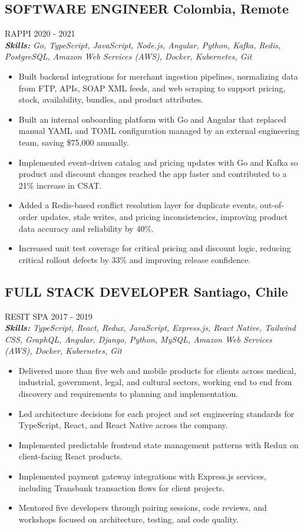 \documentclass{article}
\newcommand{\WorkExperience}[2]{
   \subsection*{#1}
   \vspace{-1em}
   \uppercase{#2}
}
\newcommand{\Skills}[1]{
   \textit{\textbf{Skills:} #1}
}
\begin{document}
\WorkExperience{SOFTWARE ENGINEER \hfill Colombia, Remote}{Rappi \hfill 2020 {-} 2021} \\
\Skills{Go, TypeScript, JavaScript, Node.js, Angular, Python, Kafka, Redis, PostgreSQL, Amazon Web Services (AWS), Docker, Kubernetes, Git}
\begin{itemize}
\item Built backend integrations for merchant ingestion pipelines, normalizing data from FTP, APIs, SOAP XML feeds, and web scraping to support pricing, stock, availability, bundles, and product attributes.
\item Built an internal onboarding platform with Go and Angular that replaced manual YAML and TOML configuration managed by an external engineering team, saving \$75,000 annually.
\item Implemented event-driven catalog and pricing updates with Go and Kafka so product and discount changes reached the app faster and contributed to a 21\% increase in CSAT.
\item Added a Redis-based conflict resolution layer for duplicate events, out-of-order updates, stale writes, and pricing inconsistencies, improving product data accuracy and reliability by 40\%.
\item Increased unit test coverage for critical pricing and discount logic, reducing critical rollout defects by 33\% and improving release confidence.
\end{itemize}

\WorkExperience{FULL STACK DEVELOPER \hfill Santiago, Chile}{Resit SPA \hfill 2017 {-} 2019} \\
\Skills{TypeScript, React, Redux, JavaScript, Express.js, React Native, Tailwind CSS, GraphQL, Angular, Django, Python, MySQL, Amazon Web Services (AWS), Docker, Kubernetes, Git}
\begin{itemize}
\item Delivered more than five web and mobile products for clients across medical, industrial, government, legal, and cultural sectors, working end to end from discovery and requirements to planning and implementation.
\item Led architecture decisions for each project and set engineering standards for TypeScript, React, and React Native across the company.
\item Implemented predictable frontend state management patterns with Redux on client-facing React products.
\item Implemented payment gateway integrations with Express.js services, including Transbank transaction flows for client projects.
\item Mentored five developers through pairing sessions, code reviews, and workshops focused on architecture, testing, and code quality.
\end{itemize}
\end{document}
